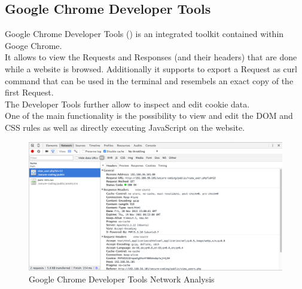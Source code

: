 \subsection{Google Chrome Developer Tools}
Google Chrome Developer Tools () is an integrated toolkit contained within Googe Chrome.\\
It allows to view the Requests and Responses (and their headers) that are done while a website is browsed. Additionally it supports to export a Request as curl command that can be used in the terminal and resembels an exact copy of the first Request.\\
The Developer Tools further allow to inspect and edit cookie data.\\
One of the main functionality is the possibility to view and edit the DOM and CSS rules as well as directly executing JavaScript on the website.
\begin{figure}[ht]
	\centering
	\includegraphics[width=.8\linewidth]{figures/tool_chrome_dev_tools.png}
	\caption{Google Chrome Developer Tools Network Analysis}
	\label{fig:tool_chrome_dev_tools}
\end{figure}
